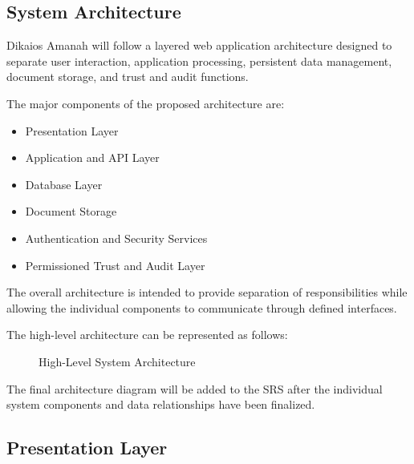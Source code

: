 
\subsection{System Architecture}

Dikaios Amanah will follow a layered web application architecture designed
to separate user interaction, application processing, persistent data
management, document storage, and trust and audit functions.

The major components of the proposed architecture are:

\begin{itemize}
    \item Presentation Layer
    \item Application and API Layer
    \item Database Layer
    \item Document Storage
    \item Authentication and Security Services
    \item Permissioned Trust and Audit Layer
\end{itemize}

The overall architecture is intended to provide separation of
responsibilities while allowing the individual components to communicate
through defined interfaces.

The high-level architecture can be represented as follows:

\begin{figure}[H]
    \centering
    \caption{High-Level System Architecture}
    \label{fig:system_architecture}
\end{figure}

The final architecture diagram will be added to the SRS after the
individual system components and data relationships have been finalized.


\subsection{Presentation Layer}

